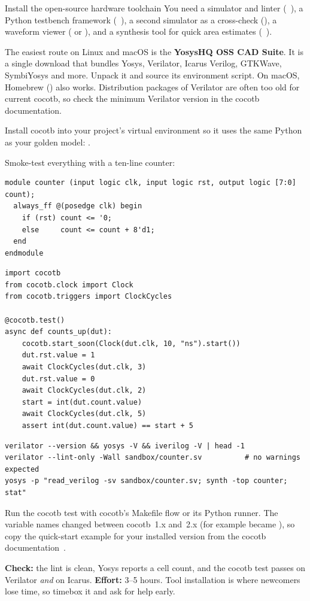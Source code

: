 \begin{stepbox}[label=st:setup:tools]{Install the open-source hardware toolchain}
You need a simulator and linter (~\cite{verilator}), a
Python testbench framework (~\cite{cocotb}), a second simulator as
a cross-check (), a waveform viewer ( or
), and a synthesis tool for quick area estimates
(~\cite{yosys}).

The easiest route on Linux and macOS is the \textbf{YosysHQ OSS CAD Suite}. It
is a single download that bundles Yosys, Verilator, Icarus Verilog, GTKWave,
SymbiYosys and more. Unpack it and source its environment script. On macOS,
Homebrew () also works.
Distribution packages of Verilator are often too old for current cocotb, so
check the minimum Verilator version in the cocotb documentation.

Install cocotb into your project's virtual environment so it uses the same
Python as your golden model: .

Smoke-test everything with a ten-line counter:

\begin{lstlisting}[style=sv,caption={\texttt{sandbox/counter.sv}}]
module counter (input logic clk, input logic rst, output logic [7:0] count);
  always_ff @(posedge clk) begin
    if (rst) count <= '0;
    else     count <= count + 8'd1;
  end
endmodule
\end{lstlisting}

\begin{lstlisting}[style=py,caption={\texttt{sandbox/test\_counter.py}}]
import cocotb
from cocotb.clock import Clock
from cocotb.triggers import ClockCycles

@cocotb.test()
async def counts_up(dut):
    cocotb.start_soon(Clock(dut.clk, 10, "ns").start())
    dut.rst.value = 1
    await ClockCycles(dut.clk, 3)
    dut.rst.value = 0
    await ClockCycles(dut.clk, 2)
    start = int(dut.count.value)
    await ClockCycles(dut.clk, 5)
    assert int(dut.count.value) == start + 5
\end{lstlisting}

\begin{lstlisting}[style=shell]
verilator --version && yosys -V && iverilog -V | head -1
verilator --lint-only -Wall sandbox/counter.sv          # no warnings expected
yosys -p "read_verilog -sv sandbox/counter.sv; synth -top counter; stat"
\end{lstlisting}

Run the cocotb test with cocotb's Makefile flow or its Python runner. The
variable names changed between cocotb~1.x and~2.x (for example 
became ), so copy the quick-start example for your
installed version from the cocotb documentation~\cite{ch12-13:cocotbdocs}.

\textbf{Check:} the lint is clean, Yosys reports a cell count, and the cocotb
test passes on Verilator \emph{and} on Icarus. \textbf{Effort:} 3--5 hours.
Tool installation is where newcomers lose time, so timebox it and ask for help
early.
\end{stepbox}

